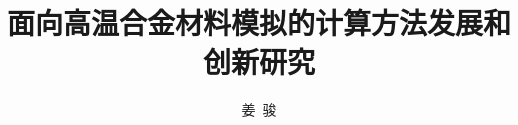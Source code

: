 
\title{面向高温合金材料模拟的计算方法发展和创新研究}
\author[ ]{姜~骏}   %
\renewcommand*{\Authfont}{\small\rm} %
\renewcommand*{\Affilfont}{\small\it} %
\renewcommand\Authands{ and } %
\renewcommand\Authands{ , } %
\date{} %


\maketitle
